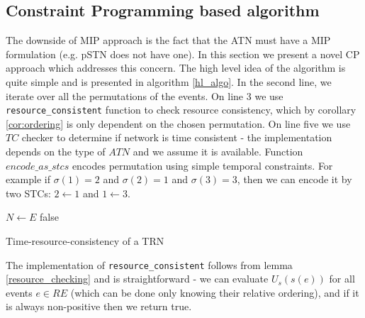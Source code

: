\subsection{Constraint Programming based algorithm}
The downside of MIP approach is the fact that the ATN must have a MIP formulation (e.g. pSTN does not have one). In this section we present a novel CP approach which addresses this concern. The high level idea of the algorithm is quite simple and is presented in algorithm \ref{hl_algo}. In the second line, we iterate over all the permutations of the events. On line 3 we use \texttt{resource\_consistent} function to check resource consistency, which by corollary \ref{cor:ordering} is only dependent on the chosen permutation. On line five we use $TC$ checker to determine if network is time consistent - the implementation depends on the type of $ATN$ and we assume it is available. Function $encode\_as\_stcs$ encodes permutation using simple temporal constraints. For example if $\sigma(1) = 2$ and $\sigma(2) = 1$ and $\sigma(3) = 3$, then we can encode it by two STCs: $ 2 \leftarrow 1 $ and $1 \leftarrow 3$.

\begin{algorithm}[h]
    \label{hl_algo}
    $N \leftarrow E$\;
    \Return false\;
    \caption{Time-resource-consistency of a TRN }
\end{algorithm}

\vspace{10mm}

The implementation of \texttt{resource\_consistent} follows from lemma \ref{resource_checking} and is straightforward - we can evaluate $U_s(s(e))$ for all events $e \in RE$ (which can be done only knowing their relative ordering), and if it is always non-positive then we return true.

